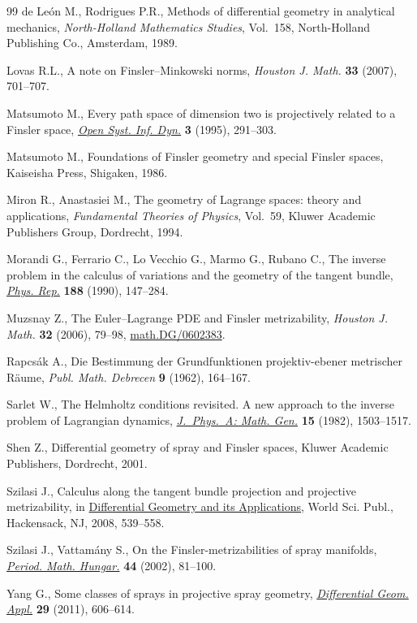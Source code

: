 \documentclass[pdftex]{sigma}
\numberwithin{equation}{section}
\begin{document}
\begin{thebibliography}{99}
de Le\'on M., Rodrigues P.R.,
Methods of dif\/ferential geometry in analytical mechanics,
{\it North-Holland Mathematics Studies}, Vol.~158, North-Holland Publishing Co., Amsterdam, 1989.

Lovas R.L.,
A note on Finsler--Minkowski norms,
{\it Houston J. Math.}  {\bf 33} (2007), 701--707.

Matsumoto M.,
Every path space of dimension two is projectively related to a Finsler space,
\href{http://dx.doi.org/10.1007/BF02228993}{{\it Open Syst. Inf. Dyn.}} {\bf 3} (1995), 291--303.

Matsumoto M.,
Foundations of Finsler geometry and special Finsler spaces, Kaiseisha Press, Shigaken, 1986.

Miron R., Anastasiei M.,
The geometry of Lagrange spaces: theory and applications,
{\it Fundamental Theories of Physics}, Vol.~59, Kluwer Academic Publishers Group, Dordrecht, 1994.

Morandi G., Ferrario C., Lo Vecchio G., Marmo G., Rubano C.,
The inverse problem in the calculus of variations and the geometry of the tangent bundle,
\href{http://dx.doi.org/10.1016/0370-1573(90)90137-Q}{{\it Phys. Rep.}} {\bf 188} (1990), 147--284.

Muzsnay Z.,
The Euler--Lagrange PDE and Finsler metrizability,
{\it Houston J. Math.}  \textbf{32} (2006), 79--98,
\href{http://arxiv.org/abs/math.DG/0602383}{math.DG/0602383}.

Rapcs\'ak A.,
Die Bestimmung der Grundfunktionen projektiv-ebener metrischer R\"aume,
{\it Publ. Math. Debrecen} {\bf 9} (1962), 164--167.

Sarlet W.,
The Helmholtz conditions revisited. A new approach to the inverse problem of Lagrangian dynamics,
\href{http://dx.doi.org/10.1088/0305-4470/15/5/013}{{\it J.~Phys.~A: Math. Gen.}} \textbf{15} (1982), 1503--1517.

Shen Z.,
Dif\/ferential geometry of spray and Finsler spaces,
Kluwer Academic Publishers, Dordrecht, 2001.

Szilasi J.,
Calculus along the tangent bundle projection and projective metrizability,
in \href{http://dx.doi.org/10.1142/9789812790613_0045}{Dif\/ferential Geometry and its Applications},
 World Sci. Publ., Hackensack, NJ, 2008, 539--558.

Szilasi J., Vattam\'any S.,
On the Finsler-metrizabilities of spray manifolds,
\href{http://dx.doi.org/10.1023/A:1014928103275}{{\it Period. Math. Hungar.}} {\bf 44} (2002), 81--100.

Yang G.,
Some classes of sprays in projective spray geometry,
\href{http://dx.doi.org/10.1016/j.difgeo.2011.04.041}{{\it Differential Geom. Appl.}} {\bf 29} (2011), 606--614.

\end{thebibliography}\LastPageEnding
\end{document}
